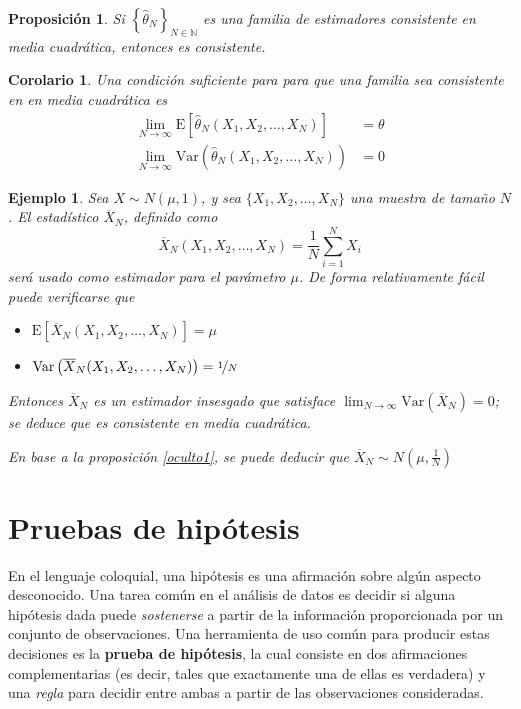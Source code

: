 \documentclass[12pt,letterpaper]{book}
\newtheorem{proposicion}[teorema]{Proposición}
\newtheorem{corolario}[teorema]{Corolario}
\newtheorem{ejemplo}{Ejemplo}[chapter]
\newcommand{\N}{\mathbb{N}}
\newcommand{\E}[1]{\mathrm{E}\left[ #1 \right]}
\newcommand{\Var}[1]{\mathrm{Var}\left( #1 \right)}
\begin{document}
\begin{proposicion}
Si $\left\{ \widehat{\theta}_N \right\}_{N\in \N}$ es una familia de estimadores consistente en media cuadrática, entonces es consistente.
\end{proposicion}

\begin{corolario}
Una condición suficiente para para que una familia sea consistente en en media cuadrática es
\begin{align}
\lim_{N\rightarrow\infty} \E{\widehat{\theta}_N(X_1,X_2,\dots,X_N)} &= \theta \\
\lim_{N\rightarrow\infty} \Var{\widehat{\theta}_N(X_1,X_2,\dots,X_N)} &= 0
\end{align}
\end{corolario}

\begin{ejemplo}
Sea $X\sim N(\mu,1)$, y sea $\{ X_1, X_2, \dots, X_N \}$ una muestra de tamaño $N$. El estadístico $\overline{X}_N$, definido como
\begin{equation}
\overline{X}_N (X_1,X_2,\dots,X_N) = \frac{1}{N} \sum_{i=1}^N X_i
\end{equation}
será usado como estimador para el parámetro $\mu$.
%
De forma relativamente fácil puede verificarse que
\begin{itemize}
\item $\E{\overline{X}_N (X_1,X_2,\dots,X_N)} = \mu$
\item $\Var{\overline{X}_N (X_1,X_2,\dots,X_N)} = \nicefrac{1}{N}$
\end{itemize}

Entonces $\overline{X}_N$ es un estimador insesgado que satisface $\lim_{N\rightarrow\infty} \Var{\overline{X}_N}=0$; se deduce que es consistente en media cuadrática.

En base a la proposición \ref{oculto1}, se puede deducir que $\overline{X}_N \sim N\left(\mu,\frac{1}{N}\right)$
\end{ejemplo}


\section{Pruebas de hipótesis}

En el lenguaje coloquial, una hipótesis es una afirmación sobre algún aspecto desconocido.
%
Una tarea común en el análisis de datos es decidir si alguna hipótesis dada puede \textit{sostenerse} a partir de la información proporcionada por un conjunto de observaciones. 
%
Una herramienta de uso común para producir estas decisiones es la \textbf{prueba de hipótesis}, la cual consiste en dos afirmaciones complementarias (es decir, tales que exactamente una de ellas es verdadera) y una \textit{regla} para decidir entre ambas a partir de las observaciones consideradas.
\end{document}
